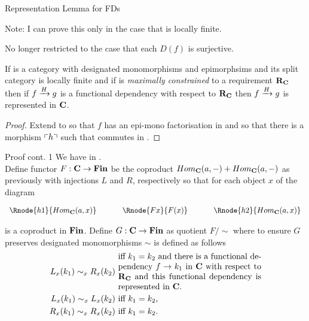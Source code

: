 \begin{frame}{Representation Lemma for FDs}
{\small Note: I can prove this only in the case that \catcw is locally finite.

No longer restricted to the case that each $D(f)$ is surjective.}

\begin{lemma}
If \catcw is a category with designated monomorphisms and epimorphsims and its split category
is locally finite and if \catcw is
\textit{maximally constrained} to a requirement $\reqtc$ then
if $\fundep{H}{f}{g}$  is a functional dependency with respect to $\reqtc$
then $\fundep{H}{f}{g}$ is represented in $\catc$.
\end{lemma}
\begin{proof} Extend \catcw to \catcpw so that $f$ has an epi-mono factorisation in \catcpw
and so that there  is a morphism $\qq{h}$ such that
commutes in \catcp.  
\end{proof}
\end{frame}

\begin{frame}{Proof cont. 1}
We have \fgsourcediagram in \catc.\\
\medskip
Define functor $F: \catc \morph \Fin$ be the coproduct $Hom_{\catc}(a,-) + Hom_{\catc}(a,-)$
as previously with injections $L$ and $R$, respectively so that
for each object $x$ of \catcw the diagram
\begin{center}
$
\begin{array}{c p{0.5cm} c p{0.5cm} c  }
\Rnode{h1}{Hom_{\catc}(a,x)}  &&\Rnode{Fx}{F(x)}  &&   \Rnode{h2}{Hom_{\catc}(a,x)}       
\end{array} 
$
\end{center}
is a coproduct in $\Fin$.
\medskip
Define $G: \catc \morph \Fin$ as quotient $F/\sim$ where 
to ensure $G$ preserves designated monomorphisms  $\sim$ is defined as follows
\begin{align*}
L_x(k_1) \sim_x R_x(k_2) & \mbox{ \parbox{6cm}{iff  $k_1=k_2$ and there is a functional dependency 
$f \morph k_1$ in \catcw with respect to $\reqtc$ and  this functional dependency is represented in \catc.}}\\
L_x(k_1) \sim_x L_x(k_2) & \mbox{ iff $k_1 = k_2$,} \\
R_x(k_1) \sim_x R_x(k_2) & \mbox{ iff $k_1 = k_2$.} \\
\end{align*} 
\end{frame}

